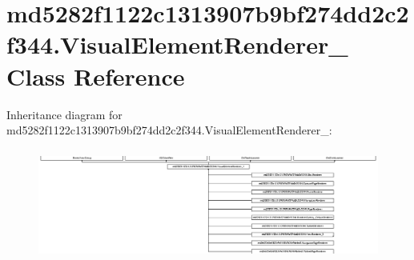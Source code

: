 \hypertarget{classmd5282f1122c1313907b9bf274dd2c2f344_1_1VisualElementRenderer__1}{}\section{md5282f1122c1313907b9bf274dd2c2f344.\+Visual\+Element\+Renderer\+\_ Class Reference}
\label{classmd5282f1122c1313907b9bf274dd2c2f344_1_1VisualElementRenderer__1}
Inheritance diagram for md5282f1122c1313907b9bf274dd2c2f344.\+Visual\+Element\+Renderer\+\_\+:\begin{figure}[H]
\begin{center}
\leavevmode
\includegraphics[height=3.660131cm]{classmd5282f1122c1313907b9bf274dd2c2f344_1_1VisualElementRenderer__1}
\end{center}
\end{figure}
